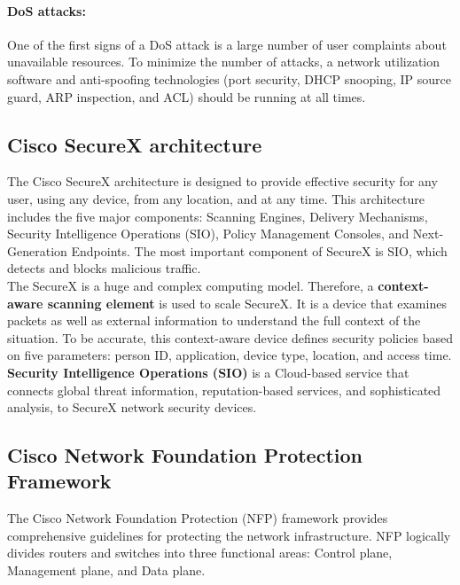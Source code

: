 \paragraph{DoS attacks:} One of the first signs of a DoS attack is a large number of user complaints about unavailable resources. To minimize the number of attacks, a network utilization software and anti-spoofing technologies (port security, DHCP snooping, IP source guard, ARP inspection, and ACL) should be running at all times. 

\subsection{Cisco SecureX architecture}

The Cisco SecureX architecture is designed to provide effective security for any user, using any device, from any location, and at any time. This architecture includes the five major components: Scanning Engines, Delivery Mechanisms, Security Intelligence Operations (SIO), Policy Management Consoles, and Next-Generation Endpoints. The most important component of SecureX is SIO, which detects and blocks malicious traffic.\\

The SecureX is a huge and complex computing model. Therefore, a \textbf{context-aware scanning element} is used to scale SecureX. It is a device that examines packets as well as external information to understand the full context of the situation. To be accurate, this context-aware device defines security policies based on five parameters: person ID, application, device type, location, and access time.\\

\textbf{Security Intelligence Operations (SIO)} is a Cloud-based service that connects global threat information, reputation-based services, and sophisticated analysis, to SecureX network security devices.

\subsection{Cisco Network Foundation Protection Framework}

The Cisco Network Foundation Protection (NFP) framework provides comprehensive guidelines for protecting the network infrastructure.  NFP logically divides routers and switches into three functional areas: Control plane, Management plane, and Data plane.\\

